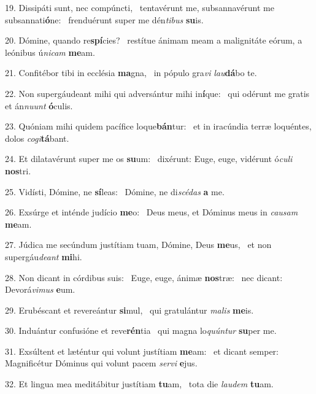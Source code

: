 19. Dissipáti sunt, nec compúncti, \dag\  tentavérunt me, subsannavérunt me subsannati\textbf{ó}ne: \ast\  frenduérunt super me dén\textit{ti}\textit{bus} \textbf{su}is.\

20. Dómine, quando re\textbf{spí}cies? \ast\  restítue ánimam meam a malignitáte eórum, a leónibus ú\textit{ni}\textit{cam} \textbf{me}am.\

21. Confitébor tibi in ecclésia \textbf{ma}gna, \ast\  in pópulo gra\textit{vi} \textit{lau}\textbf{dá}bo te.\

22. Non supergáudeant mihi qui adversántur mihi in\textbf{í}que: \ast\  qui odérunt me gratis et án\textit{nu}\textit{unt} \textbf{ó}culis.\

23. Quóniam mihi quidem pacífice loque\textbf{bán}tur: \ast\  et in iracúndia terræ loquéntes, dolos \textit{co}\textit{gi}\textbf{tá}bant.\

24. Et dilatavérunt super me os \textbf{su}um: \ast\  dixérunt: Euge, euge, vidérunt ó\textit{cu}\textit{li} \textbf{nos}tri.\

25. Vidísti, Dómine, ne \textbf{sí}leas: \ast\  Dómine, ne di\textit{scé}\textit{das} \textbf{a} me.\

26. Exsúrge et inténde judício \textbf{me}o: \ast\  Deus meus, et Dóminus meus in \textit{cau}\textit{sam} \textbf{me}am.\

27. Júdica me secúndum justítiam tuam, Dómine, Deus \textbf{me}us, \ast\  et non supergáu\textit{de}\textit{ant} \textbf{mi}hi.\

28. Non dicant in córdibus suis: \dag\  Euge, euge, ánimæ \textbf{nos}træ: \ast\  nec dicant: Devorá\textit{vi}\textit{mus} \textbf{e}um.\

29. Erubéscant et revereántur \textbf{si}mul, \ast\  qui gratulántur \textit{ma}\textit{lis} \textbf{me}is.\

30. Induántur confusióne et reve\textbf{rén}tia \ast\  qui magna lo\textit{quún}\textit{tur} \textbf{su}per me.\

31. Exsúltent et læténtur qui volunt justítiam \textbf{me}am: \ast\  et dicant semper: Magnificétur Dóminus qui volunt pacem \textit{ser}\textit{vi} \textbf{e}jus.\

32. Et lingua mea meditábitur justítiam \textbf{tu}am, \ast\  tota die \textit{lau}\textit{dem} \textbf{tu}am.\

